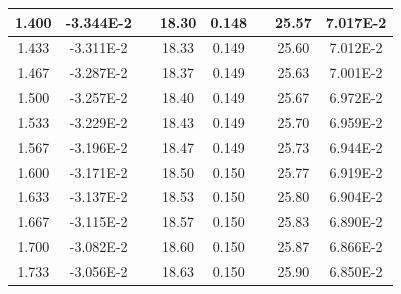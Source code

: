 \documentclass[article,12pt]{elsarticle}
\begin{document}
\begin{longtable}[c]{|c|c|cccccc}
1.400    & -3.344E-2 & \multicolumn{1}{c|}{} & \multicolumn{1}{c|}{18.30}   & \multicolumn{1}{c|}{0.148} & \multicolumn{1}{c|}{} & \multicolumn{1}{c|}{25.57}   & \multicolumn{1}{c|}{7.017E-2} \\ \hline
1.433    & -3.311E-2 & \multicolumn{1}{c|}{} & \multicolumn{1}{c|}{18.33}   & \multicolumn{1}{c|}{0.149} & \multicolumn{1}{c|}{} & \multicolumn{1}{c|}{25.60}   & \multicolumn{1}{c|}{7.012E-2} \\ \hline
1.467    & -3.287E-2 & \multicolumn{1}{c|}{} & \multicolumn{1}{c|}{18.37}   & \multicolumn{1}{c|}{0.149} & \multicolumn{1}{c|}{} & \multicolumn{1}{c|}{25.63}   & \multicolumn{1}{c|}{7.001E-2} \\ \hline
1.500    & -3.257E-2 & \multicolumn{1}{c|}{} & \multicolumn{1}{c|}{18.40}   & \multicolumn{1}{c|}{0.149} & \multicolumn{1}{c|}{} & \multicolumn{1}{c|}{25.67}   & \multicolumn{1}{c|}{6.972E-2} \\ \hline
1.533    & -3.229E-2 & \multicolumn{1}{c|}{} & \multicolumn{1}{c|}{18.43}   & \multicolumn{1}{c|}{0.149} & \multicolumn{1}{c|}{} & \multicolumn{1}{c|}{25.70}   & \multicolumn{1}{c|}{6.959E-2} \\ \hline
1.567    & -3.196E-2 & \multicolumn{1}{c|}{} & \multicolumn{1}{c|}{18.47}   & \multicolumn{1}{c|}{0.149} & \multicolumn{1}{c|}{} & \multicolumn{1}{c|}{25.73}   & \multicolumn{1}{c|}{6.944E-2} \\ \hline
1.600    & -3.171E-2 & \multicolumn{1}{c|}{} & \multicolumn{1}{c|}{18.50}   & \multicolumn{1}{c|}{0.150} & \multicolumn{1}{c|}{} & \multicolumn{1}{c|}{25.77}   & \multicolumn{1}{c|}{6.919E-2} \\ \hline
1.633    & -3.137E-2 & \multicolumn{1}{c|}{} & \multicolumn{1}{c|}{18.53}   & \multicolumn{1}{c|}{0.150} & \multicolumn{1}{c|}{} & \multicolumn{1}{c|}{25.80}   & \multicolumn{1}{c|}{6.904E-2} \\ \hline
1.667    & -3.115E-2 & \multicolumn{1}{c|}{} & \multicolumn{1}{c|}{18.57}   & \multicolumn{1}{c|}{0.150} & \multicolumn{1}{c|}{} & \multicolumn{1}{c|}{25.83}   & \multicolumn{1}{c|}{6.890E-2} \\ \hline
1.700    & -3.082E-2 & \multicolumn{1}{c|}{} & \multicolumn{1}{c|}{18.60}   & \multicolumn{1}{c|}{0.150} & \multicolumn{1}{c|}{} & \multicolumn{1}{c|}{25.87}   & \multicolumn{1}{c|}{6.866E-2} \\ \hline
1.733    & -3.056E-2 & \multicolumn{1}{c|}{} & \multicolumn{1}{c|}{18.63}   & \multicolumn{1}{c|}{0.150} & \multicolumn{1}{c|}{} & \multicolumn{1}{c|}{25.90}   & \multicolumn{1}{c|}{6.850E-2} \\ \hline

\end{longtable}
\end{document}
